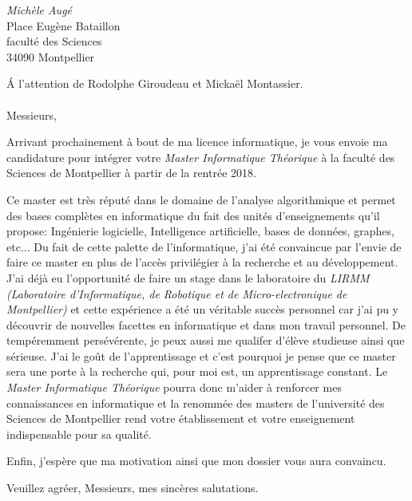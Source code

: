 \documentclass{lettre}
\begin{document}
\begin{letter}{\emph{Michèle Augé}\\ Place Eugène Bataillon\\ faculté des Sciences\\34090 Montpellier}

\date{\today}
\address{47 rue Alexandre Cabanel \\34000 Montpellier}
\notelephone
\nofax
\signature{Camille \textsc{Gosset}}

\opening{\'A l'attention de Rodolphe Giroudeau et Mickaël Montassier. \\\\
Messieurs, }

Arrivant prochainement à bout de ma licence informatique, je vous envoie ma candidature pour intégrer votre \emph{Master Informatique Théorique} à la faculté des Sciences de Montpellier à partir de la rentrée 2018.

Ce master est très réputé dans le domaine de l'analyse algorithmique et permet des bases complètes en informatique du fait des unités d'enseignements qu'il propose: Ingénierie logicielle, Intelligence artificielle, bases de données, graphes, etc... Du fait de cette palette de l'informatique, j'ai été convaincue par l'envie de faire ce master en plus de l'accès privilégier à la recherche et au développement. J'ai déjà eu l'opportunité de faire un stage dans le laboratoire du \emph{LIRMM (Laboratoire d'Informatique, de Robotique et de Micro-electronique de Montpellier)} et cette expérience a été un véritable succès personnel car j'ai pu y découvrir de nouvelles facettes en informatique et dans mon travail personnel. De tempéremment persévérente, je peux aussi me qualifer d'élève studieuse ainsi que sérieuse. J'ai le goût de l'apprentissage et c'est pourquoi je pense que ce master sera une porte à la recherche qui, pour moi est, un apprentissage constant. Le \emph{Master Informatique Théorique} pourra donc m'aider à renforcer mes connaissances en informatique et la renommée des masters de l'université des Sciences de Montpellier rend votre établissement et votre enseignement indispensable pour sa qualité. 

Enfin, j'espère que ma motivation ainsi que mon dossier vous aura convaincu.

\closing{Veuillez agréer, Messieurs, mes sincères salutations.}

\end{letter}
\end{document}
